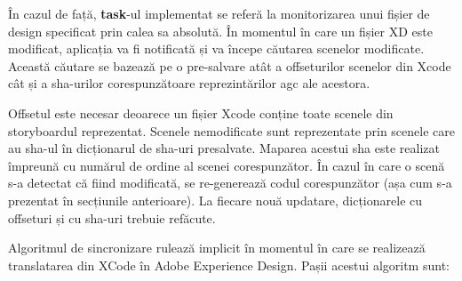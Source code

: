 În cazul de față, \textbf{task}-ul implementat se referă la monitorizarea unui fișier de design specificat prin calea sa absolută. În momentul în care un fișier XD este modificat, aplicația va fi notificată și va începe căutarea scenelor modificate. 
Această căutare se bazează pe o pre-salvare atât a offseturilor scenelor din Xcode cât și a sha-urilor corespunzătoare reprezintărilor agc ale acestora. 

Offsetul este necesar deoarece un fișier Xcode conține toate scenele din storyboardul reprezentat.  Scenele nemodificate sunt reprezentate prin scenele care au sha-ul în dicționarul de sha-uri presalvate. Maparea acestui sha este realizat împreună cu numărul de ordine al scenei corespunzător. 
În cazul în care o scenă s-a detectat că fiind modificată, se re-generează codul corespunzător (așa cum s-a prezentat în secțiunile anterioare).  La fiecare nouă updatare, dicționarele cu offseturi și cu sha-uri trebuie refăcute.

Algoritmul de sincronizare rulează implicit în momentul în care se realizează translatarea din XCode în Adobe Experience Design. Pașii acestui algoritm sunt:

